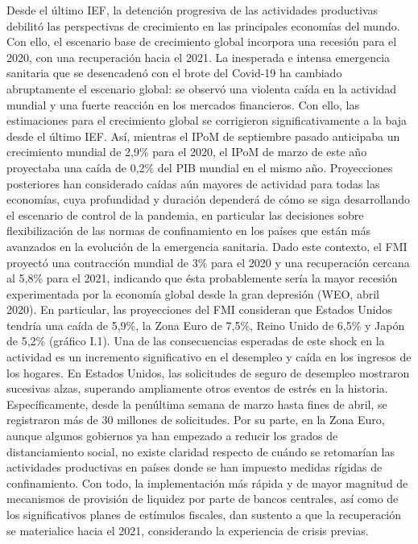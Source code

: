 \documentclass[
]{book}
\begin{document}
Desde el último IEF, la detención progresiva de las actividades
productivas debilitó las perspectivas de crecimiento en las principales
economías del mundo. Con ello, el escenario base de crecimiento
global incorpora una recesión para el 2020, con una recuperación
hacia el 2021.
La inesperada e intensa emergencia sanitaria que se desencadenó con el brote
del Covid-19 ha cambiado abruptamente el escenario global: se observó una
violenta caída en la actividad mundial y una fuerte reacción en los mercados
financieros. Con ello, las estimaciones para el crecimiento global se corrigieron
significativamente a la baja desde el último IEF. Así, mientras el IPoM de
septiembre pasado anticipaba un crecimiento mundial de 2,9\% para el 2020,
el IPoM de marzo de este año proyectaba una caída de 0,2\% del PIB mundial
en el mismo año. Proyecciones posteriores han considerado caídas aún mayores
de actividad para todas las economías, cuya profundidad y duración dependerá
de cómo se siga desarrollando el escenario de control de la pandemia, en
particular las decisiones sobre flexibilización de las normas de confinamiento en
los países que están más avanzados en la evolución de la emergencia sanitaria.
Dado este contexto, el FMI proyectó una contracción mundial de 3\% para el
2020 y una recuperación cercana al 5,8\% para el 2021, indicando que ésta
probablemente sería la mayor recesión experimentada por la economía global desde la gran depresión (WEO, abril 2020). En particular, las proyecciones
del FMI consideran que Estados Unidos tendría una caída de 5,9\%, la Zona
Euro de 7,5\%, Reino Unido de 6,5\% y Japón de 5,2\% (gráfico I.1). Una de
las consecuencias esperadas de este shock en la actividad es un incremento
significativo en el desempleo y caída en los ingresos de los hogares. En Estados
Unidos, las solicitudes de seguro de desempleo mostraron sucesivas alzas,
superando ampliamente otros eventos de estrés en la historia. Específicamente,
desde la penúltima semana de marzo hasta fines de abril, se registraron más
de 30 millones de solicitudes. Por su parte, en la Zona Euro, aunque algunos
gobiernos ya han empezado a reducir los grados de distanciamiento social, no
existe claridad respecto de cuándo se retomarían las actividades productivas en
países donde se han impuesto medidas rígidas de confinamiento. Con todo, la
implementación más rápida y de mayor magnitud de mecanismos de provisión
de liquidez por parte de bancos centrales, así como de los significativos planes
de estímulos fiscales, dan sustento a que la recuperación se materialice hacia el
2021, considerando la experiencia de crisis previas.
\end{document}
